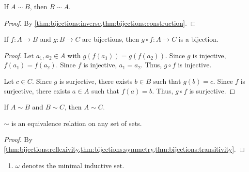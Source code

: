 \begin{proposition}[Symmetry] \label{thm:bijections:symmetry}
    If $A \sim B$, then $B \sim A$.
\end{proposition}
\begin{proof}
    By \cref{thm:bijections:inverse,thm:bijections:construction}.
\end{proof}
\begin{proposition}[Composition] \label{thm:bijections:composition}
    If $f : A \to B$ and $g : B \to C$ are bijections, then
    $g \circ f : A \to C$ is a bijection.
\end{proposition}
\begin{proof}
    Let $a_{1}, a_{2} \in A$ with $g(f(a_{1})) = g(f(a_{2}))$.
    Since $g$ is injective, $f(a_{1}) = f(a_{2})$.
    Since $f$ is injective, $a_{1} = a_{2}$.
    Thus, $g \circ f$ is injective.

    Let $c \in C$.
    Since $g$ is surjective, there exists $b \in B$ such that $g(b) = c$.
    Since $f$ is surjective, there exists $a \in A$ such that $f(a) = b$.
    Thus, $g \circ f$ is surjective.
\end{proof}
\begin{corollary}[Transitivity] \label{thm:bijections:transitivity}
    If $A \sim B$ and $B \sim C$, then $A \sim C$.
\end{corollary}

\begin{theorem}[Equivalence] \label{thm:bijections:equivalence}
    $\sim$ is an equivalence relation on any set of sets.
\end{theorem}
\begin{proof}
    By \cref{thm:bijections:reflexivity,thm:bijections:symmetry,thm:bijections:transitivity}.
\end{proof}
\begin{notation} \leavevmode
    \begin{enumerate}
        \item $\omega$ denotes the minimal inductive set.
    \end{enumerate}
\end{notation}

